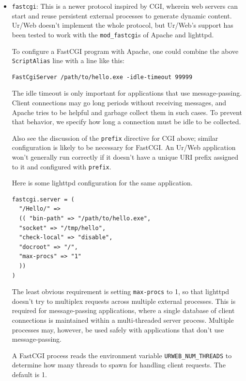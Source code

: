\documentclass{article}
\newcommand{\cd}[1]{\texttt{#1}}
\begin{document}
\begin{itemize}
\begin{itemize}
    To access the \texttt{foo} function in the \texttt{Bar} module, you would then hit \texttt{http://somewhere/dir/script.exe/Bar/foo}.

    If your application contains form handlers that read cookies before causing side effects, then you will need to use the \texttt{sigfile} \texttt{.urp} directive, too.

  \item \texttt{fastcgi}: This is a newer protocol inspired by CGI, wherein web servers can start and reuse persistent external processes to generate dynamic content.  Ur/Web doesn't implement the whole protocol, but Ur/Web's support has been tested to work with the \texttt{mod\_fastcgi}s of Apache and lighttpd.

    To configure a FastCGI program with Apache, one could combine the above \texttt{ScriptAlias} line with a line like this:
    \begin{verbatim}
FastCgiServer /path/to/hello.exe -idle-timeout 99999
    \end{verbatim}
    The idle timeout is only important for applications that use message-passing.  Client connections may go long periods without receiving messages, and Apache tries to be helpful and garbage collect them in such cases.  To prevent that behavior, we specify how long a connection must be idle to be collected.

    Also see the discussion of the \cd{prefix} directive for CGI above; similar configuration is likely to be necessary for FastCGI.  An Ur/Web application won't generally run correctly if it doesn't have a unique URI prefix assigned to it and configured with \cd{prefix}.

    Here is some lighttpd configuration for the same application.
    \begin{verbatim}
fastcgi.server = (
  "/Hello/" =>
  (( "bin-path" => "/path/to/hello.exe",
  "socket" => "/tmp/hello",
  "check-local" => "disable",
  "docroot" => "/",
  "max-procs" => "1"
  ))
)
    \end{verbatim}
    The least obvious requirement is setting \texttt{max-procs} to 1, so that lighttpd doesn't try to multiplex requests across multiple external processes.  This is required for message-passing applications, where a single database of client connections is maintained within a multi-threaded server process.  Multiple processes may, however, be used safely with applications that don't use message-passing.

    A FastCGI process reads the environment variable \texttt{URWEB\_NUM\_THREADS} to determine how many threads to spawn for handling client requests.  The default is 1.


\end{itemize}
\end{itemize}
\end{document}
